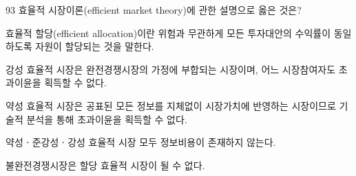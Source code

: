 \begin{question}{93}
효율적 시장이론(efficient market theory)에 관한 설명으로 옳은 것은?
\begin{choices}
  \item 효율적 할당(efficient allocation)이란 위험과 무관하게 모든 투자대안의 수익률이 동일하도록 자원이 할당되는 것을 말한다.
  \item 강성 효율적 시장은 완전경쟁시장의 가정에 부합되는 시장이며, 어느 시장참여자도 초과이윤을 획득할 수 없다.
  \item 약성 효율적 시장은 공표된 모든 정보를 지체없이 시장가치에 반영하는 시장이므로 기술적 분석을 통해 초과이윤을 획득할 수 없다.
  \item 약성ㆍ준강성ㆍ강성 효율적 시장 모두 정보비용이 존재하지 않는다.
  \item 불완전경쟁시장은 할당 효율적 시장이 될 수 없다.
\end{choices}
\end{question}
